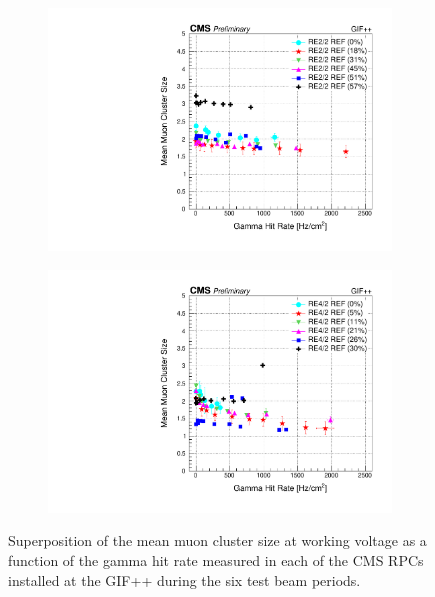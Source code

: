 \begin{figure}[H]
\begin{subfigure}{0.5\linewidth}
    		\includegraphics[width = \linewidth]{fig/chapt5/RE2-2_REF_muon_cluster_vs_Rate.pdf}
        	\caption{\label{fig:GIFpp_cls_vs_rate:C}}
    	\end{subfigure}
    	\begin{subfigure}{0.5\linewidth}
			\centering
    		\includegraphics[width = \linewidth]{fig/chapt5/RE4-2_REF_muon_cluster_vs_Rate.pdf}
        	\caption{\label{fig:GIFpp_cls_vs_rate:D}}
    	\end{subfigure}
		\caption{\label{fig:GIFpp_cls_vs_rate} Superposition of the mean muon cluster size at working voltage as a function of the gamma hit rate measured in each of the CMS RPCs installed at the GIF++ during the six test beam periods.}
	\end{figure}

